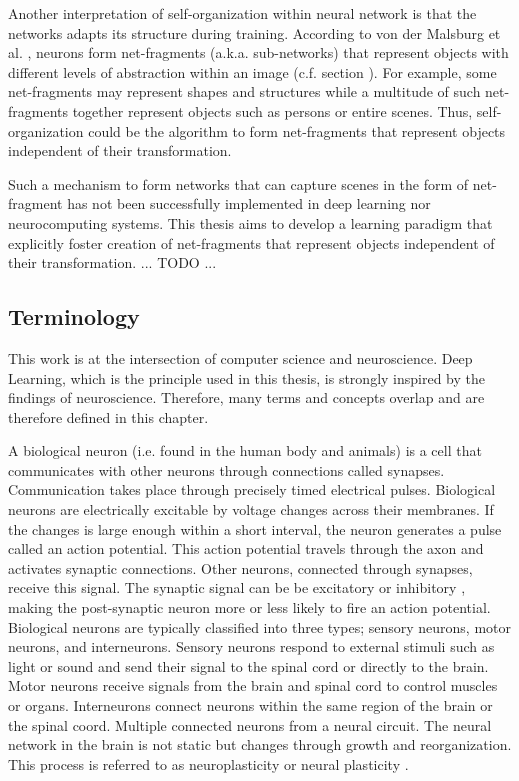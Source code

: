 Another interpretation of self-organization within neural network is that the networks adapts its structure during training.
According to von der Malsburg et al. \cite{von_der_Malsburg_Stadelmann_Grewe_2022}, neurons form net-fragments (a.k.a. sub-networks) that represent objects with different levels of abstraction within an image (c.f. section ).
For example, some net-fragments may represent shapes and structures while a multitude of such net-fragments together represent objects such as persons or entire scenes.
Thus, self-organization could be the algorithm to form net-fragments that represent objects independent of their transformation.

Such a mechanism to form networks that can capture scenes in the form of net-fragment has not been successfully implemented in deep learning nor neurocomputing systems.
This thesis aims to develop a learning paradigm that explicitly foster creation of net-fragments that represent objects independent of their transformation.
... TODO ...


\subsection{Terminology}
This work is at the intersection of computer science and neuroscience.
Deep Learning, which is the principle used in this thesis, is strongly inspired by the findings of neuroscience.
Therefore, many terms and concepts overlap and are therefore defined in this chapter.

A biological neuron (i.e. found in the human body and animals) is a cell that communicates with other neurons through connections called synapses.
Communication takes place through precisely timed electrical pulses.
Biological neurons are electrically excitable by voltage changes across their membranes.
If the changes is large enough within a short interval, the neuron generates a pulse called an action potential.
This action potential travels through the axon and activates synaptic connections.
Other neurons, connected through synapses, receive this signal.
The synaptic signal can be be excitatory  or inhibitory , making the post-synaptic neuron more or less likely to fire an action potential.
Biological neurons are typically classified into three types; sensory neurons, motor neurons, and interneurons.
Sensory neurons respond to external stimuli such as light or sound and send their signal to the spinal cord or directly to the brain.
Motor neurons receive signals from the brain and spinal cord to control muscles or organs.
Interneurons connect neurons within the same region of the brain or the spinal coord.
Multiple connected neurons from a neural circuit.
The neural network in the brain is not static but changes through growth and reorganization.
This process is referred to as neuroplasticity or neural plasticity .

